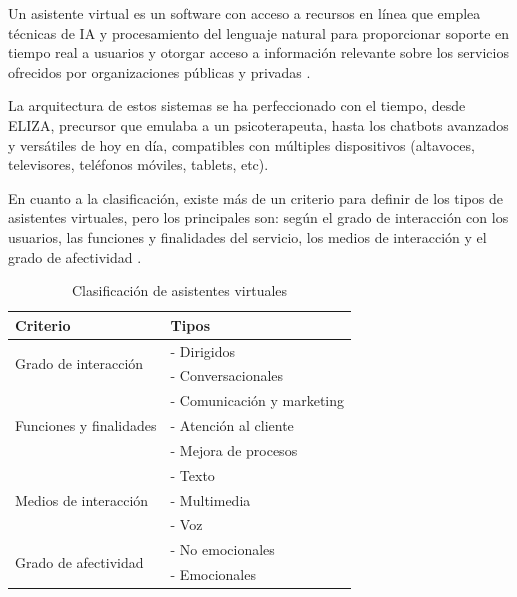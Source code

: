 Un asistente virtual es un software con acceso a recursos en línea que emplea técnicas de IA y procesamiento del lenguaje natural para proporcionar soporte en tiempo real a usuarios y otorgar acceso a información relevante sobre los servicios ofrecidos por organizaciones públicas y privadas \parencite{tfgAlexa1}.

La arquitectura de estos sistemas se ha perfeccionado con el tiempo, desde ELIZA, precursor que emulaba a un psicoterapeuta, hasta los chatbots avanzados y versátiles de hoy en día, compatibles con múltiples dispositivos (altavoces, televisores, teléfonos móviles, tablets, etc).

En cuanto a la clasificación, existe más de un criterio para definir de los tipos de asistentes virtuales, pero los principales son: según el grado de interacción con los usuarios, las funciones y finalidades del servicio, los medios de interacción y el grado de afectividad \parencite{asistentesConv}.

\begin{table}[H]
    \centering
    \begin{tabular}{|l|l|}
    \hline
    \textbf{Criterio} & \textbf{Tipos} \\
    \hline
    \multirow{2}{*}{Grado de interacción} & - Dirigidos \\
     & - Conversacionales \\
    \hline
    \multirow{3}{*}{Funciones y finalidades} & - Comunicación y marketing \\
     & - Atención al cliente \\
     & - Mejora de procesos \\
    \hline
    \multirow{3}{*}{Medios de interacción} & - Texto \\
     & - Multimedia \\
     & - Voz \\
    \hline
    \multirow{2}{*}{Grado de afectividad} & - No emocionales \\
     & - Emocionales \\
    \hline
    \end{tabular}
    \caption{Clasificación de asistentes virtuales}
    \label{tab:criterios_asistentes_virtuales}
\end{table}

